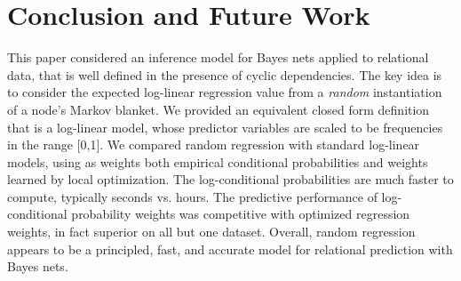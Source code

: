 \documentclass[twoside,leqno,twocolumn]{article}
\begin{document}



\section{Conclusion and Future Work} This paper considered an inference model for Bayes nets applied to relational data, that is well defined in the presence of cyclic dependencies. The key idea is to consider the expected log-linear regression value from a {\em random} instantiation of a node's Markov blanket. We provided an equivalent closed form definition that is a log-linear model, whose predictor variables are scaled to be frequencies in the range [0,1]. We compared random regression with standard log-linear models, using as weights both empirical conditional probabilities and weights learned by local optimization. 
The log-conditional probabilities are much faster to compute, typically seconds vs. hours. The predictive performance of log-conditional probability weights was competitive with optimized regression weights, in fact superior on all but one dataset. Overall, random regression appears to be a principled, fast, and accurate model for relational prediction with Bayes nets.
%



\end{document}
